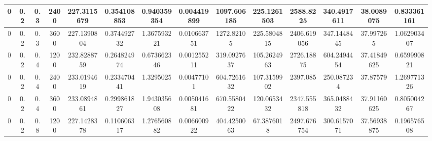 \documentclass[main.tex]{subfiles}
\begin{document}
\begin{table}[ht]
\begin{tabular}{cccccccccccccc}
		\multicolumn{1}{|c|}{0}  & \multicolumn{1}{c|}{0.2} & \multicolumn{1}{c|}{0.3} & \multicolumn{1}{c|}{2400} & \multicolumn{1}{c|}{227.3115679} & \multicolumn{1}{c|}{0.354108853} & \multicolumn{1}{c|}{0.940359354} & \multicolumn{1}{c|}{0.004419899} & \multicolumn{1}{c|}{1097.606185} & \multicolumn{1}{c|}{225.1261503} & \multicolumn{1}{c|}{2588.8225}   & \multicolumn{1}{c|}{340.4917611} & \multicolumn{1}{c|}{38.0089075}  & \multicolumn{1}{c|}{0.833361161} \\ \hline
		\multicolumn{1}{|c|}{0}  & \multicolumn{1}{c|}{0.2} & \multicolumn{1}{c|}{0.3} & \multicolumn{1}{c|}{3600} & \multicolumn{1}{c|}{227.1390804} & \multicolumn{1}{c|}{0.374492732} & \multicolumn{1}{c|}{1.367593221} & \multicolumn{1}{c|}{0.010663751} & \multicolumn{1}{c|}{1272.82105}  & \multicolumn{1}{c|}{225.5804815} & \multicolumn{1}{c|}{2406.619056} & \multicolumn{1}{c|}{347.1448445} & \multicolumn{1}{c|}{37.997265}   & \multicolumn{1}{c|}{1.062903407} \\ \hline
		\multicolumn{1}{|c|}{0}  & \multicolumn{1}{c|}{0.2} & \multicolumn{1}{c|}{0.4} & \multicolumn{1}{c|}{1200} & \multicolumn{1}{c|}{232.8288759} & \multicolumn{1}{c|}{0.264824974} & \multicolumn{1}{c|}{0.673662346} & \multicolumn{1}{c|}{0.001255211} & \multicolumn{1}{c|}{319.0927637} & \multicolumn{1}{c|}{105.2624963} & \multicolumn{1}{c|}{2726.18875}  & \multicolumn{1}{c|}{604.2494454} & \multicolumn{1}{c|}{37.41849625} & \multicolumn{1}{c|}{0.659990821} \\ \hline
		\multicolumn{1}{|c|}{0}  & \multicolumn{1}{c|}{0.2} & \multicolumn{1}{c|}{0.4} & \multicolumn{1}{c|}{2400} & \multicolumn{1}{c|}{233.0194619} & \multicolumn{1}{c|}{0.233470441} & \multicolumn{1}{c|}{1.3295025}   & \multicolumn{1}{c|}{0.00477101}  & \multicolumn{1}{c|}{604.7261632} & \multicolumn{1}{c|}{107.3159902} & \multicolumn{1}{c|}{2397.085}    & \multicolumn{1}{c|}{250.087234}  & \multicolumn{1}{c|}{37.87579}    & \multicolumn{1}{c|}{1.269771326} \\ \hline
		\multicolumn{1}{|c|}{0}  & \multicolumn{1}{c|}{0.2} & \multicolumn{1}{c|}{0.4} & \multicolumn{1}{c|}{3600} & \multicolumn{1}{c|}{233.0894861} & \multicolumn{1}{c|}{0.299861827} & \multicolumn{1}{c|}{1.943035608} & \multicolumn{1}{c|}{0.005041681} & \multicolumn{1}{c|}{670.5580422} & \multicolumn{1}{c|}{120.0653432} & \multicolumn{1}{c|}{2347.555818} & \multicolumn{1}{c|}{365.0488432} & \multicolumn{1}{c|}{37.91160625} & \multicolumn{1}{c|}{0.805004267} \\ \hline
		\multicolumn{1}{|c|}{0}  & \multicolumn{1}{c|}{0.2} & \multicolumn{1}{c|}{0.8} & \multicolumn{1}{c|}{1200} & \multicolumn{1}{c|}{227.1428378} & \multicolumn{1}{c|}{0.110606317} & \multicolumn{1}{c|}{1.276560882} & \multicolumn{1}{c|}{0.006600922} & \multicolumn{1}{c|}{404.4250063} & \multicolumn{1}{c|}{67.3876018}  & \multicolumn{1}{c|}{2497.676754} & \multicolumn{1}{c|}{300.6157071} & \multicolumn{1}{c|}{37.56938875} & \multicolumn{1}{c|}{0.196576508} \\ \hline

\end{tabular}
\end{table}
\end{document}
